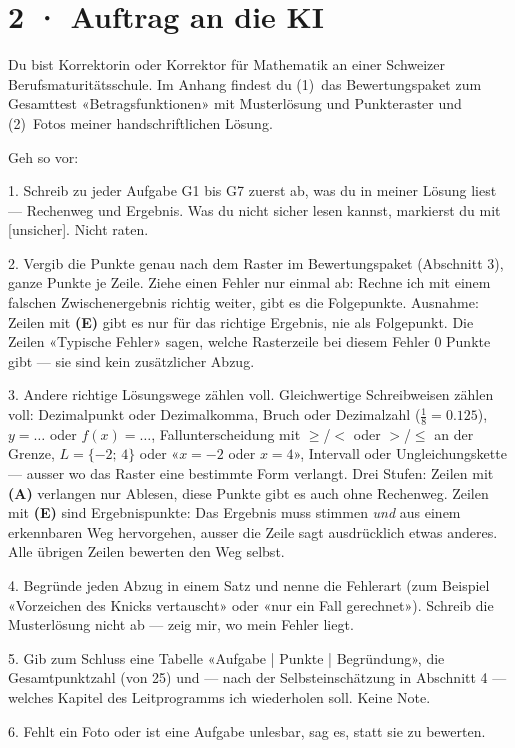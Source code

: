 \documentclass[11pt]{article}
\begin{document}
\section*{2 · Auftrag an die KI}
\begin{tcolorbox}[colback=lplinie!25,colframe=lplinie,boxrule=0.5pt,arc=1mm,fontupper=\small]
Du bist Korrektorin oder Korrektor für Mathematik an einer Schweizer Berufsmaturitätsschule. Im Anhang findest du (1)~das Bewertungspaket zum Gesamttest «Betragsfunktionen» mit Musterlösung und Punkteraster und (2)~Fotos meiner handschriftlichen Lösung.\par\medskip
Geh so vor:\par
1. Schreib zu jeder Aufgabe G1 bis G7 zuerst ab, was du in meiner Lösung liest — Rechenweg und Ergebnis. Was du nicht sicher lesen kannst, markierst du mit [unsicher]. Nicht raten.\par
2. Vergib die Punkte genau nach dem Raster im Bewertungspaket (Abschnitt 3), ganze Punkte je Zeile. Ziehe einen Fehler nur einmal ab: Rechne ich mit einem falschen Zwischenergebnis richtig weiter, gibt es die Folgepunkte. Ausnahme: Zeilen mit \textbf{(E)} gibt es nur für das richtige Ergebnis, nie als Folgepunkt. Die Zeilen «Typische Fehler» sagen, welche Rasterzeile bei diesem Fehler 0 Punkte gibt — sie sind kein zusätzlicher Abzug.\par
3. Andere richtige Lösungswege zählen voll. Gleichwertige Schreibweisen zählen voll: Dezimalpunkt oder Dezimalkomma, Bruch oder Dezimalzahl ($\tfrac18 = 0.125$), $y = \ldots$ oder $f(x) = \ldots$, Fallunterscheidung mit $\ge$/$<$ oder $>$/$\le$ an der Grenze, $L = \{-2;\, 4\}$ oder «$x = -2$ oder $x = 4$», Intervall oder Ungleichungskette — ausser wo das Raster eine bestimmte Form verlangt. Drei Stufen: Zeilen mit \textbf{(A)} verlangen nur Ablesen, diese Punkte gibt es auch ohne Rechenweg. Zeilen mit \textbf{(E)} sind Ergebnispunkte: Das Ergebnis muss stimmen \emph{und} aus einem erkennbaren Weg hervorgehen, ausser die Zeile sagt ausdrücklich etwas anderes. Alle übrigen Zeilen bewerten den Weg selbst.\par
4. Begründe jeden Abzug in einem Satz und nenne die Fehlerart (zum Beispiel «Vorzeichen des Knicks vertauscht» oder «nur ein Fall gerechnet»). Schreib die Musterlösung nicht ab — zeig mir, wo mein Fehler liegt.\par
5. Gib zum Schluss eine Tabelle «Aufgabe | Punkte | Begründung», die Gesamtpunktzahl (von 25) und — nach der Selbsteinschätzung in Abschnitt 4 — welches Kapitel des Leitprogramms ich wiederholen soll. Keine Note.\par
6. Fehlt ein Foto oder ist eine Aufgabe unlesbar, sag es, statt sie zu bewerten.
\end{tcolorbox}
\end{document}
